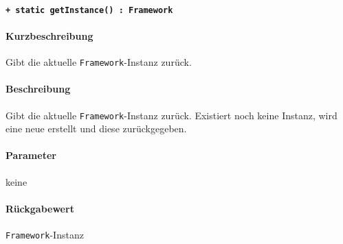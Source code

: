 \paragraph{\texttt{+ static getInstance() : Framework}}\label{AP_Framework_getInstance}%
\paragraph*{Kurzbeschreibung}
Gibt die aktuelle \verb#Framework#-Instanz zurück.
\paragraph*{Beschreibung}
Gibt die aktuelle \verb#Framework#-Instanz zurück.
Existiert noch keine Instanz, wird eine neue erstellt und diese zurückgegeben.
\paragraph*{Parameter}
keine
\paragraph*{Rückgabewert}
\verb#Framework#-Instanz